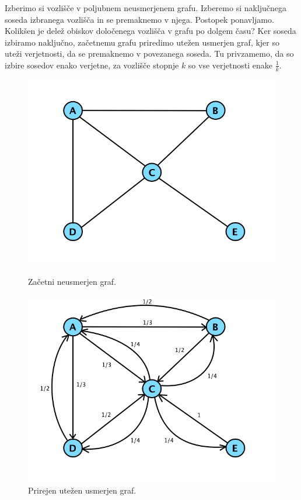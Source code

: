 \documentclass[mat1]{fmfdelo}
\begin{document}
\begin{zgled}
    Izberimo si vozlišče v poljubnem neusmerjenem grafu. Izberemo si naključnega soseda izbranega vozlišča in se premaknemo v njega. Postopek ponavljamo. Kolikšen je delež obiskov določenega vozlišča v grafu po dolgem času? Ker soseda izbiramo naključno, začetnemu grafu priredimo utežen usmerjen graf, kjer so uteži verjetnosti, da se premaknemo v povezanega soseda. Tu privzamemo, da so izbire sosedov enako verjetne, za vozlišče stopnje $k$ so vse verjetnosti enake $\frac{1}{k}$.
    \begin{figure}[!htb]
        \centering
        \begin{minipage}{0.5\textwidth}
            \centering
            \includegraphics[width=\textwidth]{grafUndir.jpg}
            \caption{Začetni neusmerjen graf.}
        \end{minipage}
        \hspace{-30pt}
        \begin{minipage}{0.5\textwidth}
            \centering
            \includegraphics[width=\textwidth]{grafDir.jpg}
            \caption{Prirejen utežen usmerjen graf.}
        \end{minipage}
    \end{figure}


\end{zgled}
\end{document}
